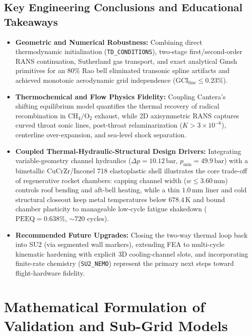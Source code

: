 \documentclass[11pt,a4paper]{article}
\begin{document}
\subsection*{Key Engineering Conclusions and Educational Takeaways}
\begin{itemize}
    \item \textbf{Geometric and Numerical Robustness:} Combining direct thermodynamic initialization (\texttt{TD\_CONDITIONS}), two-stage first/second-order RANS continuation, Sutherland gas transport, and exact analytical Gmsh primitives for an 80\% Rao bell eliminated transonic spline artifacts and achieved monotonic aerodynamic grid independence ($\mathrm{GCI}_{\mathrm{fine}} \le 0.23\%$).
    \item \textbf{Thermochemical and Flow Physics Fidelity:} Coupling Cantera's shifting equilibrium model quantifies the thermal recovery of radical recombination in $\mathrm{CH_4/O_2}$ exhaust, while 2D axisymmetric RANS captures curved throat sonic lines, post-throat relaminarization ($K > 3\times 10^{-6}$), centerline over-expansion, and sea-level shock separation.
    \item \textbf{Coupled Thermal-Hydraulic-Structural Design Drivers:} Integrating variable-geometry channel hydraulics ($\Delta p = 10.12\,\mathrm{bar}$, $p_{\min} = 49.9\,\mathrm{bar}$) with a bimetallic $\mathrm{CuCrZr}$/Inconel 718 elastoplastic shell illustrates the core trade-off of regenerative rocket chambers: capping channel width ($w \le 3.60\,\mathrm{mm}$) controls roof bending and aft-bell heating, while a thin $1.0\,\mathrm{mm}$ liner and cold structural closeout keep metal temperatures below $678.4\,\mathrm{K}$ and bound chamber plasticity to manageable low-cycle fatigue shakedown ($\mathrm{PEEQ} = 0.638\%$, $\sim 720$ cycles).
    \item \textbf{Recommended Future Upgrades:} Closing the two-way thermal loop back into SU2 (via segmented wall markers), extending FEA to multi-cycle kinematic hardening with explicit 3D cooling-channel slots, and incorporating finite-rate chemistry (\texttt{SU2\_NEMO}) represent the primary next steps toward flight-hardware fidelity.
\end{itemize}

\appendix
\section{Mathematical Formulation of Validation and Sub-Grid Models}
\label{app:validation_models}
\end{document}

